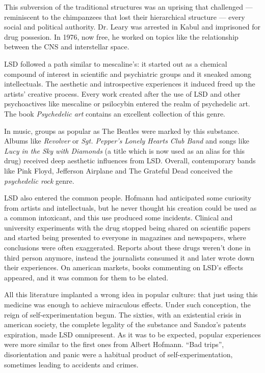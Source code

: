 This subversion of the traditional structures was an uprising that challenged --- reminiscent to the chimpanzees that lost their hierarchical structure --- every social and political authority. Dr. Leary was arrested in Kabul and imprisoned for drug possesion. In 1976, now free, he worked on topics like the relationship between the CNS and interstellar space.

LSD followed a path similar to mescaline's: it started out as a chemical compound of interest in scientific and psychiatric groups and it sneaked among intellectuals. The aesthetic and introspective experiences it induced freed up the artists' creative process. Every work created after the use of LSD and other psychoactives like mescaline or psilocybin entered the realm of psychedelic art. The book \textit{Psychedelic art} contains an excellent collection of this genre.

In music, groups as popular as The Beatles were marked by this substance. Albums like \textit{Revolver} or \textit{Sgt. Pepper’s Lonely Hearts Club Band} and songs like \textit{Lucy in the Sky with Diamonds} (a title which is now used as an alias for this drug) received deep aesthetic influences from LSD. Overall, contemporary bands like Pink Floyd, Jefferson Airplane and The Grateful Dead conceived the \textit{psychedelic rock} genre.

LSD also entered the common people. Hofmann had anticipated some curiosity from artists and intellectuals, but he never thought his creation could be used as a common intoxicant, and this use produced some incidents. Clinical and university experiments with the drug stopped being shared on scientific papers and started being presented to everyone in magazines and newspapers, where conclusions were often exaggerated. Reports about these drugs weren't done in third person anymore, instead the journalists consumed it and later wrote down their experiences. On american markets, books commenting on LSD's effects appeared, and it was common for them to be elated.

All this literature implanted a wrong idea in popular culture: that just using this medicine was enough to achieve miraculous effects. Under such conception, the reign of self-experimentation begun. The sixties, with an existential crisis in american society, the complete legality of the substance and Sandoz's patents expiration, made LSD omnipresent. As it was to be expected, popular experiences were more similar to the first ones from Albert Hofmann. \enquote{Bad trips}, disorientation and panic were a habitual product of self-experimentation, sometimes leading to accidents and crimes.

